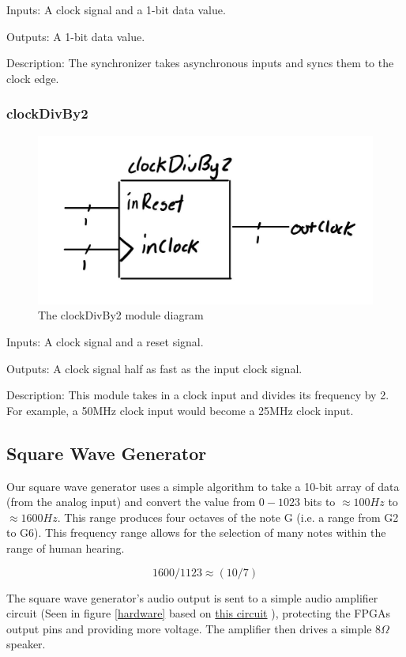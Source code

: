 \documentclass[a4paper]{article}
\begin{document}
Inputs: A clock signal and a 1-bit data value.

Outputs: A 1-bit data value.

Description: The synchronizer takes asynchronous inputs and syncs them to the clock edge.

\subsubsection{clockDivBy2}

\begin{figure}[H]
    \includegraphics[width=0.8 \linewidth]{images/clockDivBy2.JPG}
    \caption{The clockDivBy2 module diagram}
    \label{clockDivBy2Diagram}
\end{figure}

Inputs: A clock signal and a reset signal.

Outputs: A clock signal half as fast as the input clock signal.

Description: This module takes in a clock input and divides its frequency by 2. For example, a 50MHz clock input would become a 25MHz clock input.

\subsection{Square Wave Generator}
Our square wave generator uses a simple algorithm to take a 10-bit array of data (from the analog input) and convert the value from $0-1023 $ bits to $\approx 100Hz $ to$ \approx 1600 Hz$. This range produces four octaves of the note G (i.e. a range from G2 to G6). This frequency range allows for the selection of many notes within the range of human hearing. 


\begin{equation}
1600/1123 \approx (10/7)
\end{equation}

The square wave generator's audio output is sent to a simple audio amplifier circuit (Seen in figure \ref{hardware} based on \href{https://www.instructables.com/id/Tales-From-the-Chip-LM386-Audio-Amplifier/}{this circuit} ), protecting the FPGAs output pins and providing more voltage. The amplifier then drives a simple 8$\Omega$ speaker. 
\end{document}
